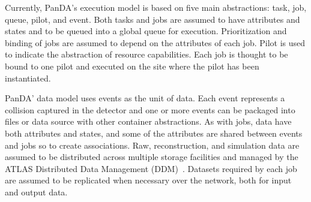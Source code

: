 Currently, PanDA's execution model is based on five main abstractions: task,
job, queue, pilot, and event. Both tasks and jobs are assumed to have attributes
and states and to be queued into a global queue for execution. Prioritization
and binding of jobs are assumed to depend on the attributes of each job. Pilot
is used to indicate the abstraction of resource capabilities. Each job is
thought to be bound to one pilot and executed on the site where the pilot has
been instantiated.


PanDA' data model uses events as the unit of data. Each event represents a collision captured in the
detector and one or more events can be packaged into files or data source with
other container abstractions. As with jobs, data have both attributes and
states, and some of the attributes are shared between events and jobs so to
create associations. Raw, reconstruction, and simulation data are assumed to be
distributed across multiple storage facilities and managed by the ATLAS
Distributed Data Management (DDM)~\cite{garonne2012atlas}. Datasets required by
each job are assumed to be replicated when necessary over the network, both for
input and output data.


